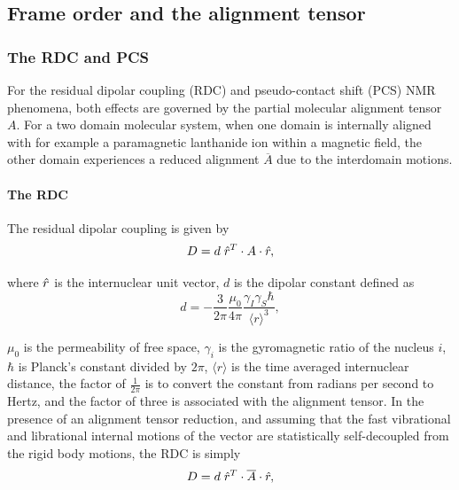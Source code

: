 
\subsection{Frame order and the alignment tensor}





\subsubsection{The RDC and PCS}

For the residual dipolar coupling (RDC) and pseudo-contact shift (PCS) NMR phenomena, both effects are governed by the partial molecular alignment tensor $A$.
For a two domain molecular system, when one domain is internally aligned with for example a paramagnetic lanthanide ion within a magnetic field, the other domain experiences a reduced alignment $\overline{A}$ due to the interdomain motions.


\paragraph{The RDC}

The residual dipolar coupling is given by
\begin{equation} \label{eq: RDC equation}
    D = d \; \hat{r}^T \cdot A \cdot \hat{r} ,
\end{equation}

where $\hat{r}$ is the internuclear unit vector, $d$ is the dipolar constant defined as
\begin{equation} \label{eq: dipolar constant}
    d = - \frac{3}{2\pi} \frac{\mu_0}{4\pi} \frac{\gamma_I \gamma_S \hbar}{\langle r \rangle^3} ,
\end{equation}

$\mu_0$ is the permeability of free space, $\gamma_i$ is the gyromagnetic ratio of the nucleus $i$, $\hbar$ is Planck's constant divided by $2\pi$, $\langle r \rangle$ is the time averaged internuclear distance, the factor of $\tfrac{1}{2\pi}$ is to convert the constant from radians per second to Hertz, and the factor of three is associated with the alignment tensor.
In the presence of an alignment tensor reduction, and assuming that the fast vibrational and librational internal motions of the vector are statistically self-decoupled from the rigid body motions, the RDC is simply
\begin{equation} \label{eq: reduced RDC equation}
    D = d \; \hat{r}^T \cdot \overline{A} \cdot \hat{r} ,
\end{equation}

